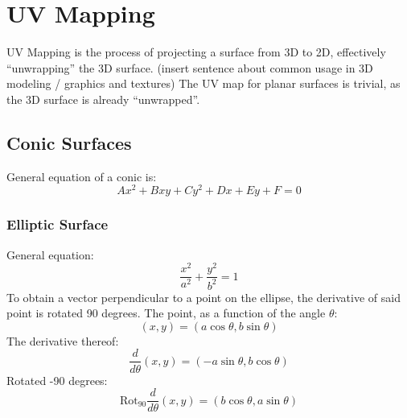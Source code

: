 \section{UV Mapping}
UV Mapping is the process of projecting a surface from 3D to 2D, effectively ``unwrapping'' the 3D surface.
(insert sentence about common usage in 3D modeling / graphics and textures)
The UV map for planar surfaces is trivial, as the 3D surface is already ``unwrapped''.

\subsection{Conic Surfaces}
General equation of a conic is:
\begin{equation}\label{eq:gen_conic}
	Ax^2 + Bxy + Cy^2 + Dx + Ey + F = 0
\end{equation}

\subsubsection{Elliptic Surface}
General equation:
\begin{equation}
	\frac{x^2}{a^2} + \frac{y^2}{b^2} = 1
\end{equation}
To obtain a vector perpendicular to a point on the ellipse, the derivative of said point is rotated 90 degrees.
The point, as a function of the angle $\theta$:
\begin{equation}
	(x,y) = (a\cos\theta, b\sin\theta)
\end{equation}
The derivative thereof:
\begin{equation}
	\frac{d}{d\theta}(x,y) = (-a\sin\theta, b\cos\theta)
\end{equation}
Rotated -90 degrees:
\begin{equation}
	\text{Rot}_{90}\frac{d}{d\theta}(x,y) = (b\cos\theta, a\sin\theta)
\end{equation}

